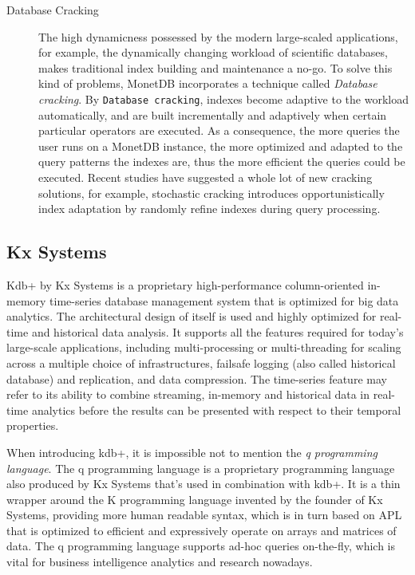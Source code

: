 \documentclass{article}
\begin{document}
\begin{description}
\item[Database Cracking] The high dynamicness possessed by the modern large-scaled applications, for example, the dynamically changing workload of scientific databases, makes traditional index building and maintenance a no-go. To solve this kind of problems, MonetDB incorporates a technique called \textit{Database cracking}. By \texttt{Database cracking}, indexes become adaptive to the workload automatically, and are built incrementally and adaptively when certain particular operators are executed.\cite{idreos2012monetdb} As a consequence, the more queries the user runs on a MonetDB instance, the more optimized and adapted to the query patterns the indexes are, thus the more efficient the queries could be executed. Recent studies have suggested a whole lot of new cracking solutions, for example, stochastic cracking introduces opportunistically index adaptation by randomly refine indexes during query processing.\cite{halim2012stochastic}
\end{description}

\subsection{Kx Systems}

Kdb+ by Kx Systems is a proprietary high-performance column-oriented in-memory time-series database management system that is optimized for big data analytics. The architectural design of itself is used and highly optimized for real-time and historical data analysis. It supports all the features required for today's large-scale applications, including multi-processing or multi-threading for scaling across a multiple choice of infrastructures, failsafe logging (also called historical database) and replication, and data compression.\cite{kdb-faq} The time-series feature may refer to its ability to combine streaming, in-memory and historical data in real-time analytics before the results can be presented with respect to their temporal properties.\cite{kdb-real-time}

When introducing kdb+, it is impossible not to mention the \textit{q programming language}. The q programming language is a proprietary programming language also produced by Kx Systems that's used in combination with kdb+. It is a thin wrapper around the K programming language invented by the founder of Kx Systems, providing more human readable syntax, which is in turn based on APL that is optimized to efficient and expressively operate on arrays and matrices of data.\cite{wiki:qlang} The q programming language supports ad-hoc queries on-the-fly, which is vital for business intelligence analytics and research nowadays.\cite{kdb-faq}
\end{document}
